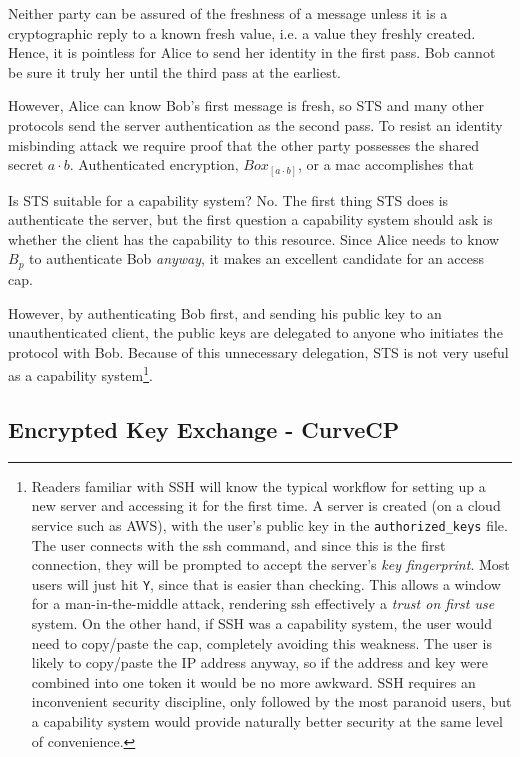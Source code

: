 \documentclass[12pt]{article}
\begin{document}
Neither party can be assured of the freshness of a message
unless it is a cryptographic reply to a known fresh value,
i.e. a value they freshly created. Hence, it is pointless for Alice
to send her identity in the first pass. Bob cannot be sure it truly her
until the third pass at the earliest.

However, Alice can know Bob's first message is fresh, so STS and many
other protocols send the server authentication as the second pass.
To resist an identity misbinding attack we require proof that the
other party possesses the shared secret $a\cdot b$. Authenticated encryption,
$Box_{[a\cdot b]}$, or a mac accomplishes that \cite[section 3.1]{sigma}


Is STS suitable for a capability system? No. The first thing STS
does is authenticate the server, but the first question a capability
system should ask is whether the client has the capability to
this resource. Since Alice needs to know $B_p$ to authenticate
Bob \emph{anyway}, it makes an excellent candidate for an access cap.

However, by authenticating Bob first, and sending his public key to
an unauthenticated client, the public keys are delegated to anyone
who initiates the protocol with Bob. Because of this unnecessary
delegation, STS is not very useful as a capability system\footnote{
  Readers familiar with SSH will know the typical workflow for setting
  up a new server and accessing it for the first time. A server is
  created (on a cloud service such as AWS), with the user's public
  key in the \texttt{authorized\_keys} file. The user connects with the
  ssh command, and since this is the first connection, they will be
  prompted to accept the server's \emph{key fingerprint}.
  Most users will just hit \texttt{Y}, since that is easier than
  checking. This allows a window for a man-in-the-middle attack,
  rendering ssh effectively a \emph{trust on first use} system.
  On the other hand, if SSH was a capability system, the user would
  need to copy/paste the cap, completely avoiding this weakness.
  The user is likely to copy/paste the IP address anyway, so if the
  address and key were combined into one token it would be no more
  awkward.
  SSH requires an inconvenient security discipline, only
  followed by the most paranoid users, but a capability system
  would provide naturally better security at the same level of
  convenience.
}.

\subsection{Encrypted Key Exchange - CurveCP}
\end{document}
